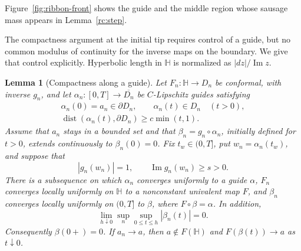 \documentclass[11pt]{article}
\newtheorem{lemma}[theorem]{Lemma}
\theoremstyle{definition}
\theoremstyle{remark}
\numberwithin{equation}{section}
\begin{document}
Figure~\ref{fig:ribbon-front} shows the guide and the middle region
whose sausage mass appears in Lemma~\ref{rc:step}.


The compactness argument at the initial tip requires control of a guide,
but no common modulus of continuity for the inverse maps on the boundary.
We give that control explicitly.  Hyperbolic length in
$\mathbb H$ is normalized as $|dz|/\operatorname{Im}z$.

\begin{lemma}[Compactness along a guide]\label{es:guide-compactness}
Let $F_n:\mathbb H\to D_n$ be conformal, with inverse $g_n$, and let
$\alpha_n:[0,T]\to\overline{D_n}$ be $C$-Lipschitz guides satisfying
\[
 \begin{gathered}
 \alpha_n(0)=a_n\in\partial D_n,\qquad
 \alpha_n(t)\in D_n\quad(t>0),\\
 \operatorname{dist}(\alpha_n(t),\partial D_n)
       \ge c\min(t,1).
 \end{gathered}
\]
Assume that $a_n$ stays in a bounded set and that
$\beta_n=g_n\circ\alpha_n$, initially defined for $t>0$, extends
continuously to $\beta_n(0)=0$.  Fix $t_w\in(0,T]$, put
$w_n=\alpha_n(t_w)$, and suppose that
\[
 |g_n(w_n)|=1,\qquad \operatorname{Im}g_n(w_n)\ge s>0.
\]
There is a subsequence on which $\alpha_n$ converges uniformly to a
guide $\alpha$, $F_n$ converges locally uniformly on $\mathbb H$ to a
nonconstant univalent map $F$, and $\beta_n$ converges locally uniformly
on $(0,T]$ to $\beta$, where $F\circ\beta=\alpha$.  In addition,
\begin{equation}\label{es:uniform-tip-collapse}
 \lim_{h\downarrow0}\sup_n\sup_{0\le t\le h}|\beta_n(t)|=0.
\end{equation}
Consequently $\beta(0+)=0$.  If $a_n\to a$, then $a\notin F(\mathbb H)$
and $F(\beta(t))\to a$ as $t\downarrow0$.
\end{lemma}
\end{document}
